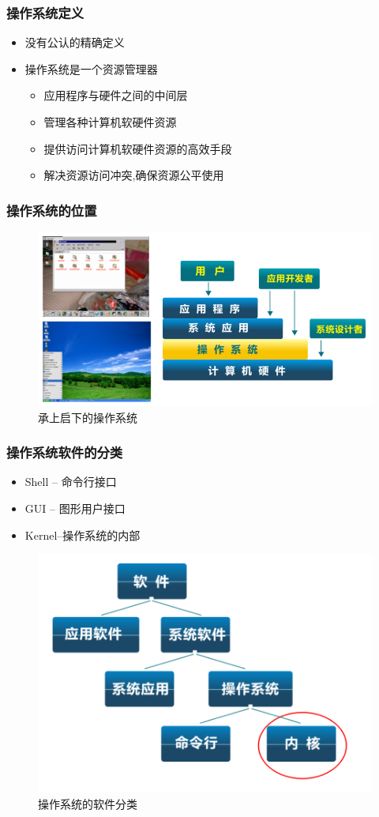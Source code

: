 \documentclass[UTF8]{ctexbeamer}
\begin{document}
\begin{frame}
\frametitle{操作系统定义}

\begin{itemize}
	\item 没有公认的精确定义
	\item 操作系统是一个资源管理器
	\begin{itemize}
		\item 应用程序与硬件之间的中间层
		\item 管理各种计算机软硬件资源
		\item 提供访问计算机软硬件资源的高效手段
		\item 解决资源访问冲突,确保资源公平使用
	\end{itemize}
\end{itemize}

\end{frame}


\begin{frame}
	\frametitle{操作系统的位置}
\begin{figure}
	\centering
	\includegraphics[width=0.8\linewidth]{os-position}
	\caption{承上启下的操作系统}
\end{figure}
\end{frame}

\begin{frame}
	\frametitle{操作系统软件的分类}
		\begin{itemize}
		\item Shell -- 命令行接口
		\item GUI -- 图形用户接口
		\item Kernel--操作系统的内部
	\end{itemize}
	\begin{figure}
		\centering
		\includegraphics[width=0.6\linewidth]{sort-of-os}
		\caption{操作系统的软件分类}
	\end{figure}
\end{frame}
\end{document}
